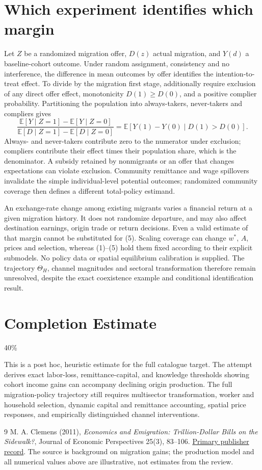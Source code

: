 \documentclass[11pt,a4paper]{article}
\newcommand{\E}{\mathbb E}
\begin{document}
\section{Which experiment identifies which margin}
Let $Z$ be a randomized migration offer, $D(z)$ actual migration, and $Y(d)$ a baseline-cohort outcome. Under random assignment, consistency and no interference, the difference in mean outcomes by offer identifies the intention-to-treat effect. To divide by the migration first stage, additionally require exclusion of any direct offer effect, monotonicity $D(1)\ge D(0)$, and a positive complier probability. Partitioning the population into always-takers, never-takers and compliers gives
\[
 \frac{\E[Y\mid Z=1]-\E[Y\mid Z=0]}
      {\E[D\mid Z=1]-\E[D\mid Z=0]}
       =\E[Y(1)-Y(0)\mid D(1)>D(0)].                 \tag{5}
\]
Always- and never-takers contribute zero to the numerator under exclusion; compliers contribute their effect times their population share, which is the denominator. A subsidy retained by nonmigrants or an offer that changes expectations can violate exclusion. Community remittance and wage spillovers invalidate the simple individual-level potential outcomes; randomized community coverage then defines a different total-policy estimand.

An exchange-rate change among existing migrants varies a financial return at a given migration history. It does not randomize departure, and may also affect destination earnings, origin trade or return decisions. Even a valid estimate of that margin cannot be substituted for (5). Scaling coverage can change $w^*$, $A$, prices and selection, whereas (1)--(5) hold them fixed according to their explicit submodels. No policy data or spatial equilibrium calibration is supplied. The trajectory $\Theta_H$, channel magnitudes and sectoral transformation therefore remain unresolved, despite the exact coexistence example and conditional identification result.

\section{Completion Estimate}
40\%

This is a post hoc, heuristic estimate for the full catalogue target.
The attempt derives exact labor-loss, remittance-capital, and knowledge thresholds showing cohort income gains can accompany declining origin production. The full migration-policy trajectory still requires multisector transformation, worker and household selection, dynamic capital and remittance accounting, spatial price responses, and empirically distinguished channel interventions.

\begin{thebibliography}{9}
 M. A. Clemens (2011), \emph{Economics and Emigration: Trillion-Dollar Bills on the Sidewalk?}, Journal of Economic Perspectives 25(3), 83--106. \href{https://www.aeaweb.org/articles?id=10.1257/jep.25.3.83}{Primary publisher record}. The source is background on migration gains; the production model and all numerical values above are illustrative, not estimates from the review.
\end{thebibliography}
\end{document}
